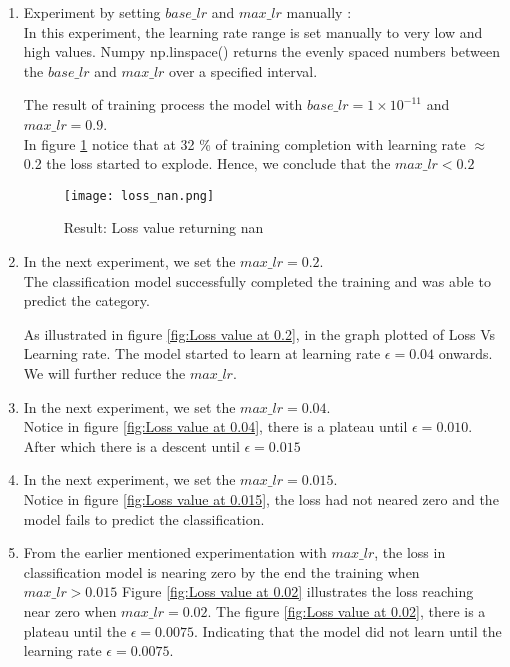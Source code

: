 \begin{enumerate}
    \item Experiment by setting $base\_lr$ and $max\_lr$  manually : \\
    In this experiment, the learning rate range is set manually to very low and high values. Numpy np.linspace() \parencite{harris2020array} returns the evenly spaced numbers between the  $base\_lr$ and $max\_lr$ over a specified interval.

    The result of training process the model with $base\_lr =1 \times 10^{-11}$ and $max\_lr=0.9$.\\
    In figure \ref{fig:Loss value} notice that at 32 \% of training completion with learning rate $\approx$ 0.2 the loss started to explode. Hence, we conclude that the  $max\_lr < 0.2$

    \begin{figure}
        \centering    
        \texttt{[image: loss\_nan.png]}
        \caption{Result: Loss value returning nan}
        \label{fig:Loss value}
    \end{figure}


    \item In the next experiment, we set the $max\_lr = 0.2$. \\
    The classification model successfully completed the training and was able to predict the category.
  
    
    As illustrated in figure \ref{fig:Loss value at 0.2}, in the graph plotted of Loss Vs Learning rate. The model started to learn at learning rate $\epsilon = 0.04$ onwards. We will further reduce the $max\_lr$.

    \item In the next experiment, we set the $max\_lr = 0.04$. \\
    Notice in figure \ref{fig:Loss value at 0.04}, there is a plateau until $\epsilon = 0.010$. After which there is a descent until $\epsilon = 0.015$


    \item In the next experiment, we set the $max\_lr = 0.015$. \\
    Notice in figure \ref{fig:Loss value at 0.015}, the loss had not neared zero and the model fails to predict the classification. 
 

    \item From the earlier mentioned experimentation with $max\_lr$,  the loss in classification model is nearing zero by the end the training  when  $max\_lr > 0.015$ 
    Figure \ref{fig:Loss value at 0.02} illustrates the loss reaching near zero when $max\_lr = 0.02$. The figure  \ref{fig:Loss value at 0.02}, there is a plateau until the $ \epsilon = 0.0075$. Indicating that the model did not learn until the learning rate $ \epsilon = 0.0075$.



\end{enumerate}
